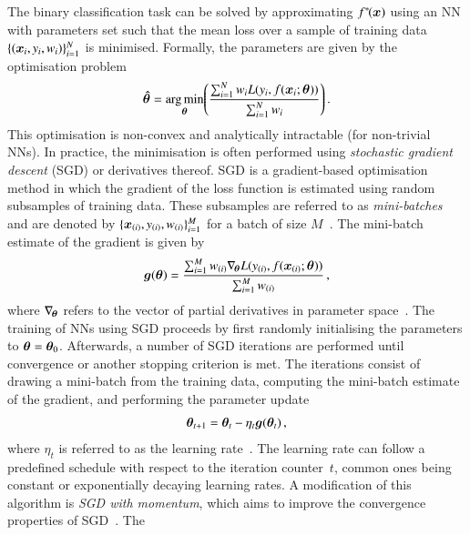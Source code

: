 The binary classification task can be solved by approximating
$f^{*\!}(\bm{x})$ using an NN with parameters set such that the mean loss
over a sample of training data~$\{ (\bm{x}_i, y_i, w_i) \}_{i = 1}^N$ is
minimised. Formally, the parameters are given by the optimisation problem
\begin{align*}
  \bm{\hat{\theta}} =
  \operatorname*{arg\,min}_{\bm{\theta}}\mathopen{}\left(
  \frac{\sum_{i = 1}^{N} w_i L(y_i, f(\bm{x}_i; \bm{\theta}))}{\sum_{i = 1}^{N} w_i}
  \right)\mathclose{}
  \,\text{.}
\end{align*}
This optimisation is non-convex and analytically intractable (for non-trivial
NNs). In practice, the minimisation is often performed using \emph{stochastic
  gradient descent} (SGD) or derivatives thereof. SGD is a gradient-based
optimisation method in which the gradient of the loss function is estimated
using random subsamples of training data. These subsamples are referred to as
\emph{mini-batches} and are denoted by
$\{\bm{x}_{(i)}, y_{(i)}, w_{(i)}\}_{i=1}^{M}$ for a batch of size
$M$~\cite{Goodfellow-et-al-2016}. The mini-batch estimate of the gradient is
given by
\begin{align*}
  \bm{g}(\bm{\theta})
  = \frac{
  \sum_{i=1}^{M} w_{(i)}  \nabla_{\!\bm{\theta}} L(y_{(i)}, f(\bm{x}_{(i)}; \bm{\theta}))
  }{
  \sum_{i=1}^{M} w_{(i)}
  } \,\text{,}
\end{align*}
where $\nabla_{\!\bm{\theta}}$ refers to the vector of partial derivatives in
parameter space~\cite{Goodfellow-et-al-2016}. The training of NNs using SGD
proceeds by first randomly initialising the parameters to
$\bm{\theta} = \bm{\theta}_0$. Afterwards, a number of SGD iterations are
performed until convergence or another stopping criterion is met. The iterations
consist of drawing a mini-batch from the training data, computing the mini-batch
estimate of the gradient, and performing the parameter update
\begin{align*}
  \bm{\theta}_{t + 1} = \bm{\theta}_{t} - \eta_{t} \bm{g}(\bm{\theta}_{t}) \,\text{,}
\end{align*}
where $\eta_{t}$ is referred to as the learning
rate~\cite{Goodfellow-et-al-2016}. The learning rate can follow a predefined
schedule with respect to the iteration counter~$t$, common ones being constant
or exponentially decaying learning rates. A modification of this algorithm is
\emph{SGD with momentum}, which aims to improve the convergence properties of
SGD~\cite{polyak1964some,rumelhart1986learning,sutskever2013importance}. The
